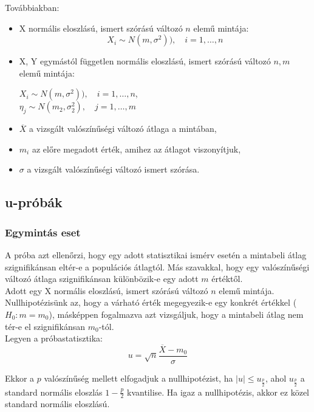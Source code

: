 \documentclass[tikz,12pt,margin=0px]{article}
\newcommand\ddfrac[2]{\frac{\displaystyle #1}{\displaystyle #2}}
\begin{document}
    \noindent Továbbiakban:
    \begin{itemize}
        \item X normális eloszlású, ismert szórású változó $n$ elemű mintája:
        \[X_i \sim N(m, \sigma^2)),\quad i=1,\ldots,n\]
        \item X, Y egymástól független normális eloszlású, ismert szórású változó $n, m$ elemű mintája:
        \begin{center}
            $X_i \sim N(m, \sigma^2)),\quad i=1,\ldots,n$, \\
            $\eta_j \sim N(m_2, \sigma_2^2),\quad j=1,\ldots, m$
        \end{center}
        \item $\overline{X}$ a vizsgált valószínűségi változó átlaga a mintában,
        \item $m_{i}$ az előre megadott érték, amihez az átlagot viszonyítjuk,
        \item $\sigma$ a vizsgált valószínűségi változó ismert szórása.
    \end{itemize}

    \subsection*{u-próbák}

    \subsubsection*{Egymintás eset}

    \noindent A próba azt ellenőrzi, hogy egy adott statisztikai ismérv esetén a mintabeli átlag szignifikánsan eltér-e a populációs átlagtól. Más szavakkal, hogy egy valószínűségi változó átlaga szignifikánsan különbözik-e egy adott $m$ értéktől.\\

    \noindent Adott egy X normális eloszlású, ismert szórású változó $n$ elemű mintája. Nullhipotézisünk az, hogy a várható érték megegyezik-e egy konkrét értékkel ($H_0 : m = m_0$), másképpen fogalmazva azt vizsgáljuk, hogy a mintabeli átlag nem tér-e el szignifikánsan $m_0$-tól.\\

    \noindent Legyen a próbastatisztika:
    \[
        u = \sqrt{n}\ddfrac{\overline{X}- m_0}{\sigma}
    \]

    \noindent Ekkor a $p$ valószínűség mellett elfogadjuk a nullhipotézist, ha $\big|u\big| \leq u_{\frac{p}{2}}$, ahol $u_{\frac{p}{2}}$ a standard normális eloszlás $1-\frac{p}{2}$ kvantilise. Ha igaz a nullhipotézis, akkor ez közel standard normális eloszlású.\\
\end{document}
